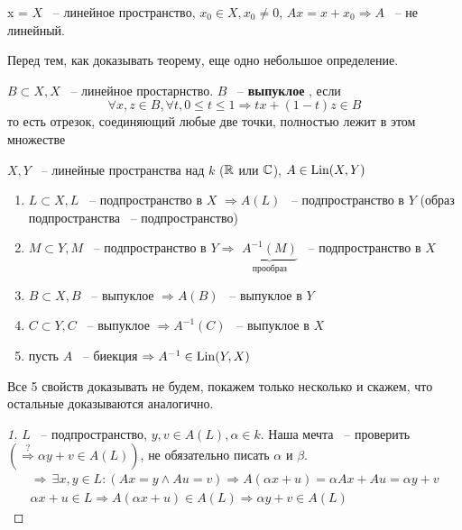 \documentclass[document]{subfiles}
\begin{document}
\begin{example}x =
    $X$ ~-- линейное пространство, $x_0 \in X, x_0 \ne 0$, $Ax = x + x_0 \Rightarrow A$ ~-- не линейный.
\end{example}

Перед тем, как доказывать теорему, еще одно небольшое определение.
\begin{definition}
    $B \subset X, X$ ~-- линейное простарнство. $B$ ~-- \textbf{ выпуклое }, если 
    \[ \forall x,z \in B, \forall t, 0 \leq t \leq 1 \Rightarrow tx + (1-t)z \in B \]
    то есть отрезок, соединяющий любые две точки, полностью лежит в этом множестве
\end{definition}

\begin{theorem}
    $X,Y$ ~-- линейные пространства над $k$ ($\mathbb{R}$ или $\mathbb{C}$), $A \in \operatorname{Lin}(X,Y)$
    \begin{enumerate}
        \item $L \subset X, L$ ~-- подпространство в $X$ $\Rightarrow A(L)$ ~-- подпространство в $Y$ (образ подпространства ~-- подпространство)
        \item $M \subset Y, M$ ~-- подпространство в $Y \Rightarrow$ $\underbrace{A^{-1}(M)}_{\text{прообраз}}$ ~-- подпространство в $X$
        \item $B \subset X, B$ ~-- выпуклое $\Rightarrow A(B)$ ~-- выпуклое в $Y$
        \item $C \subset Y, C$ ~-- выпуклое $\Rightarrow A^{-1}(C)$ ~-- выпуклое в $X$
        \item пусть $A$ ~-- биекция $\Rightarrow A^{-1} \in \operatorname{Lin}(Y,X)$
    \end{enumerate}
\end{theorem}
Все 5 свойств доказывать не будем, покажем только несколько и скажем, что остальные доказываются аналогично.
\begin{proof}[1]
    $L$ ~-- подпространство, $y,v \in A(L), \alpha \in k$. Наша мечта ~-- проверить $(\stackrel{?}{\Rightarrow} \alpha y + v \in A(L))$, не обязательно писать $\alpha$ и $\beta$.
    \begin{gather*}
        \Rightarrow \, \exists x,y \in L : (Ax = y \land Au = v) \Rightarrow A(\alpha x + u) = \alpha A x + A u = \alpha y + v \\
        \alpha x + u \in L \Rightarrow A(\alpha x + u) \in A(L) \Rightarrow \alpha y + v \in A(L)
    \end{gather*}
\end{proof}
\end{document}

